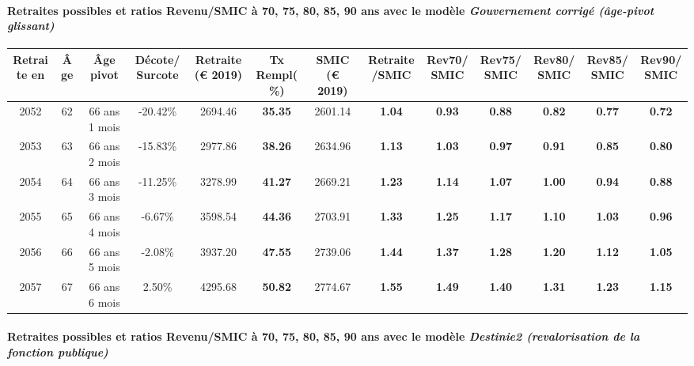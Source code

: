 \paragraph{Retraites possibles et ratios Revenu/SMIC à 70, 75, 80, 85, 90 ans avec le modèle \emph{Gouvernement corrigé (âge-pivot glissant)}}  
 
{ \scriptsize \begin{center} 
\begin{tabular}[htb]{|c|c||c|c||c|c||c||c|c|c|c|c|c|} 
\hline 
 Retraite en &  Âge &  Âge pivot &  Décote/Surcote &  Retraite (\euro{} 2019) &  Tx Rempl(\%) &  SMIC (\euro{} 2019) &  Retraite/SMIC &  Rev70/SMIC &  Rev75/SMIC &  Rev80/SMIC &  Rev85/SMIC &  Rev90/SMIC \\ 
\hline \hline 
 2052 &  62 &  66 ans 1 mois &  -20.42\% &  2694.46 &  {\bf 35.35} &  2601.14 &  {\bf 1.04} &  {\bf {\color{red} 0.93}} &  {\bf {\color{red} 0.88}} &  {\bf {\color{red} 0.82}} &  {\bf {\color{red} 0.77}} &  {\bf {\color{red} 0.72}} \\ 
\hline 
 2053 &  63 &  66 ans 2 mois &  -15.83\% &  2977.86 &  {\bf 38.26} &  2634.96 &  {\bf 1.13} &  {\bf 1.03} &  {\bf {\color{red} 0.97}} &  {\bf {\color{red} 0.91}} &  {\bf {\color{red} 0.85}} &  {\bf {\color{red} 0.80}} \\ 
\hline 
 2054 &  64 &  66 ans 3 mois &  -11.25\% &  3278.99 &  {\bf 41.27} &  2669.21 &  {\bf 1.23} &  {\bf 1.14} &  {\bf 1.07} &  {\bf {\color{red} 1.00}} &  {\bf {\color{red} 0.94}} &  {\bf {\color{red} 0.88}} \\ 
\hline 
 2055 &  65 &  66 ans 4 mois &  -6.67\% &  3598.54 &  {\bf 44.36} &  2703.91 &  {\bf 1.33} &  {\bf 1.25} &  {\bf 1.17} &  {\bf 1.10} &  {\bf 1.03} &  {\bf {\color{red} 0.96}} \\ 
\hline 
 2056 &  66 &  66 ans 5 mois &  -2.08\% &  3937.20 &  {\bf 47.55} &  2739.06 &  {\bf 1.44} &  {\bf 1.37} &  {\bf 1.28} &  {\bf 1.20} &  {\bf 1.12} &  {\bf 1.05} \\ 
\hline 
 2057 &  67 &  66 ans 6 mois &  2.50\% &  4295.68 &  {\bf 50.82} &  2774.67 &  {\bf 1.55} &  {\bf 1.49} &  {\bf 1.40} &  {\bf 1.31} &  {\bf 1.23} &  {\bf 1.15} \\ 
\hline 
\hline 
\end{tabular} 
\end{center} } 
\paragraph{Retraites possibles et ratios Revenu/SMIC à 70, 75, 80, 85, 90 ans avec le modèle \emph{Destinie2 (revalorisation de la fonction publique)}}  
 

